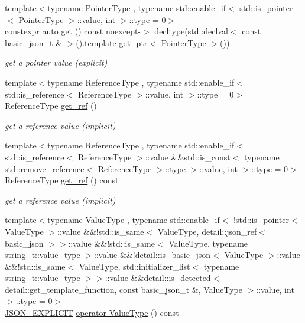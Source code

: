 \begin{DoxyCompactItemize}
{\footnotesize template$<$typename Pointer\+Type , typename std\+::enable\+\_\+if$<$ std\+::is\+\_\+pointer$<$ Pointer\+Type $>$\+::value, int $>$\+::type  = 0$>$ }\\constexpr auto \hyperlink{classnlohmann_1_1basic__json_a1d286e97ec95a81f6c6562909430aa99}{get} () const noexcept-\/$>$ decltype(std\+::declval$<$ const \hyperlink{classnlohmann_1_1basic__json_a125c0afa5f3599949b0589ef7b4aa322}{basic\+\_\+json\+\_\+t} \& $>$().template \hyperlink{classnlohmann_1_1basic__json_ae5aa126de247d34c5b4395836d05f044}{get\+\_\+ptr}$<$ Pointer\+Type $>$())
\begin{DoxyCompactList}\small\item\em get a pointer value (explicit) \end{DoxyCompactList}\item 
{\footnotesize template$<$typename Reference\+Type , typename std\+::enable\+\_\+if$<$ std\+::is\+\_\+reference$<$ Reference\+Type $>$\+::value, int $>$\+::type  = 0$>$ }\\Reference\+Type \hyperlink{classnlohmann_1_1basic__json_a14ddc6e0f6d70296bc81f810254076c5}{get\+\_\+ref} ()
\begin{DoxyCompactList}\small\item\em get a reference value (implicit) \end{DoxyCompactList}\item 
{\footnotesize template$<$typename Reference\+Type , typename std\+::enable\+\_\+if$<$ std\+::is\+\_\+reference$<$ Reference\+Type $>$\+::value \&\&std\+::is\+\_\+const$<$ typename std\+::remove\+\_\+reference$<$ Reference\+Type $>$\+::type $>$\+::value, int $>$\+::type  = 0$>$ }\\Reference\+Type \hyperlink{classnlohmann_1_1basic__json_ada108cdd8b777a013c1755ffab3d0e92}{get\+\_\+ref} () const 
\begin{DoxyCompactList}\small\item\em get a reference value (implicit) \end{DoxyCompactList}\item 
{\footnotesize template$<$typename Value\+Type , typename std\+::enable\+\_\+if$<$ !std\+::is\+\_\+pointer$<$ Value\+Type $>$\+::value \&\&!std\+::is\+\_\+same$<$ Value\+Type, detail\+::json\+\_\+ref$<$ basic\+\_\+json $>$$>$\+::value \&\&!std\+::is\+\_\+same$<$ Value\+Type, typename string\+\_\+t\+::value\+\_\+type $>$\+::value \&\&!detail\+::is\+\_\+basic\+\_\+json$<$ Value\+Type $>$\+::value \&\&!std\+::is\+\_\+same$<$ Value\+Type, std\+::initializer\+\_\+list$<$ typename string\+\_\+t\+::value\+\_\+type $>$$>$\+::value \&\&detail\+::is\+\_\+detected$<$ detail\+::get\+\_\+template\+\_\+function, const basic\+\_\+json\+\_\+t \&, Value\+Type $>$\+::value, int $>$\+::type  = 0$>$ }\\\hyperlink{json_8hpp_aefed8cf27cadeea45f12c6f3db3ce774}{J\+S\+O\+N\+\_\+\+E\+X\+P\+L\+I\+C\+IT} \hyperlink{classnlohmann_1_1basic__json_a47d7cd720f034fcca8685061b7190e1b}{operator Value\+Type} () const 

\end{DoxyCompactItemize}
